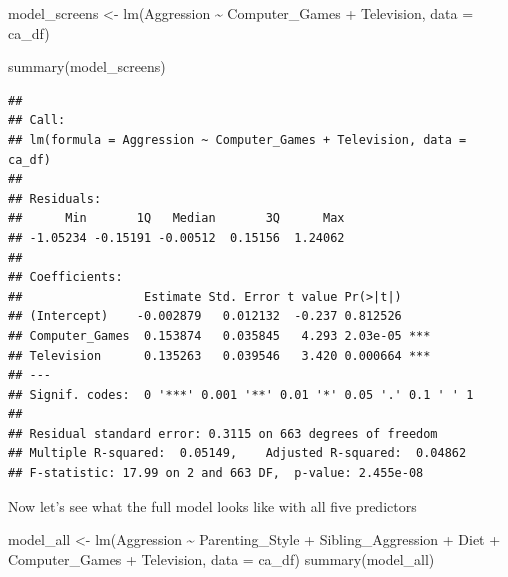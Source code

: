 \documentclass[
]{book}
\newenvironment{Shaded}{\begin{snugshade}}{\end{snugshade}}
\newcommand{\AttributeTok}[1]{\textcolor[rgb]{0.77,0.63,0.00}{#1}}
\newcommand{\FunctionTok}[1]{\textcolor[rgb]{0.00,0.00,0.00}{#1}}
\newcommand{\NormalTok}[1]{#1}
\newcommand{\OtherTok}[1]{\textcolor[rgb]{0.56,0.35,0.01}{#1}}
\newcommand{\SpecialCharTok}[1]{\textcolor[rgb]{0.00,0.00,0.00}{#1}}
\begin{document}
\begin{Shaded}
\begin{Highlighting}[]
\NormalTok{model\_screens }\OtherTok{\textless{}{-}} \FunctionTok{lm}\NormalTok{(Aggression }\SpecialCharTok{\textasciitilde{}}\NormalTok{ Computer\_Games }\SpecialCharTok{+}\NormalTok{ Television, }\AttributeTok{data =}\NormalTok{ ca\_df)}

\FunctionTok{summary}\NormalTok{(model\_screens)}
\end{Highlighting}
\end{Shaded}

\begin{verbatim}
## 
## Call:
## lm(formula = Aggression ~ Computer_Games + Television, data = ca_df)
## 
## Residuals:
##      Min       1Q   Median       3Q      Max 
## -1.05234 -0.15191 -0.00512  0.15156  1.24062 
## 
## Coefficients:
##                 Estimate Std. Error t value Pr(>|t|)    
## (Intercept)    -0.002879   0.012132  -0.237 0.812526    
## Computer_Games  0.153874   0.035845   4.293 2.03e-05 ***
## Television      0.135263   0.039546   3.420 0.000664 ***
## ---
## Signif. codes:  0 '***' 0.001 '**' 0.01 '*' 0.05 '.' 0.1 ' ' 1
## 
## Residual standard error: 0.3115 on 663 degrees of freedom
## Multiple R-squared:  0.05149,    Adjusted R-squared:  0.04862 
## F-statistic: 17.99 on 2 and 663 DF,  p-value: 2.455e-08
\end{verbatim}

Now let's see what the full model looks like with all five predictors

\begin{Shaded}
\begin{Highlighting}[]
\NormalTok{model\_all }\OtherTok{\textless{}{-}} \FunctionTok{lm}\NormalTok{(Aggression }\SpecialCharTok{\textasciitilde{}}\NormalTok{ Parenting\_Style }\SpecialCharTok{+}\NormalTok{ Sibling\_Aggression }\SpecialCharTok{+}\NormalTok{ Diet }\SpecialCharTok{+}\NormalTok{ Computer\_Games }\SpecialCharTok{+}\NormalTok{ Television, }
                \AttributeTok{data =}\NormalTok{ ca\_df)}
\FunctionTok{summary}\NormalTok{(model\_all)}
\end{Highlighting}
\end{Shaded}
\end{document}
